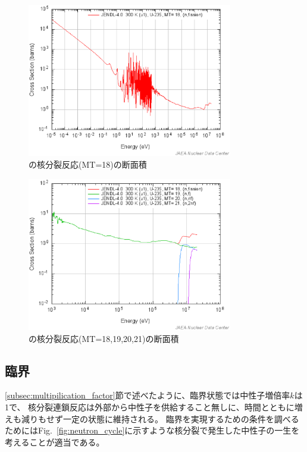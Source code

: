 \begin{figure}[htbp]
  \centering
  \includegraphics[width=0.8\textwidth]{figure/U235Fission.eps}
  \caption{の核分裂反応(MT=18)の断面積}
  \label{fig:neutron_fission}
\end{figure}

\begin{figure}[htbp]
  \centering
  \includegraphics[width=0.8\textwidth]{figure/U235Fiss_xnf.eps}
  \caption{の核分裂反応(MT=18,19,20,21)の断面積}
  \label{fig:neutron_fission_U238}
\end{figure}

\clearpage

\subsection{臨界}
\ref{subsec:multipilication_factor}節で述べたように、臨界状態では中性子増倍率$k$は1で、
核分裂連鎖反応は外部から中性子を供給すること無しに、時間とともに増えも減りもせず一定の状態に維持される。
臨界を実現するための条件を調べるためにはFig.~\ref{fig:neutron_cycle}に示すような核分裂で発生した中性子の一生を考えることが適当である。

